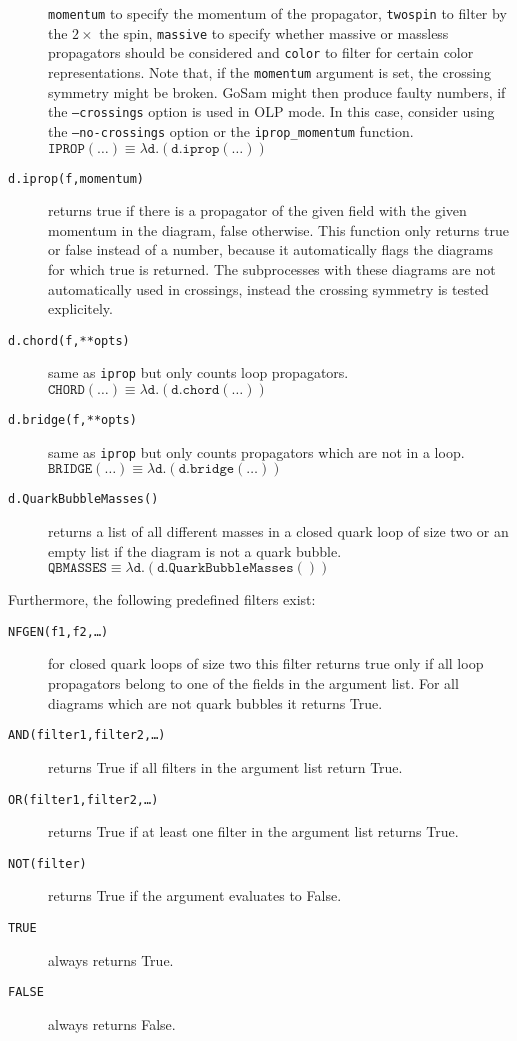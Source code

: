 \documentclass[11pt,a4paper]{refrep}
\newcommand{\gosam}{{\sc GoSam}\xspace}
\begin{document}
\begin{description}
   \texttt{momentum} to specify the momentum of the propagator,
   \texttt{twospin} to filter by the $2\times$ the spin,
   \texttt{massive} to specify whether massive or massless propagators
   should be considered and \texttt{color} to filter for certain color
   representations. Note that, if the {\tt momentum} argument is set, the 
   crossing symmetry might be broken. \gosam might then produce faulty numbers,
   if the {\tt --crossings} option is used in OLP mode. In this case, consider 
   using the {\tt --no-crossings} option or the {\tt iprop\_momentum} function.\\
   $\mathtt{IPROP(\ldots)}\equiv
    \lambda\mathtt{d}.(\mathtt{d.iprop(\ldots)})$
\item[\texttt{d.iprop(f,momentum)}] returns true if there is a propagator of the
   given field with the given momentum in the diagram, false otherwise. This 
   function only returns true or false instead of a number, because it automatically
   flags the diagrams for which true is returned. The subprocesses with these
   diagrams are not automatically used in crossings, instead the crossing symmetry
   is tested explicitely. 
\item[\texttt{d.chord(f,**opts)}] same as \texttt{iprop}
   but only counts loop propagators.\\
   $\mathtt{CHORD(\ldots)}\equiv
    \lambda\mathtt{d}.(\mathtt{d.chord(\ldots)})$
\item[\texttt{d.bridge(f,**opts)}] same as \texttt{iprop}
   but only counts propagators which are not in a loop.\\
   $\mathtt{BRIDGE(\ldots)}\equiv
    \lambda\mathtt{d}.(\mathtt{d.bridge(\ldots)})$
\item[\texttt{d.QuarkBubbleMasses()}] returns a list of
   all different masses in a closed quark loop of size two
   or an empty list if the diagram is not a quark bubble.\\
   $\mathtt{QBMASSES}\equiv
    \lambda\mathtt{d}.(\mathtt{d.QuarkBubbleMasses()})$
\end{description}

Furthermore, the following predefined filters exist:
\begin{description}
\item[\texttt{NFGEN(f1,f2,\ldots)}] for closed quark loops of size two
   this filter returns true only if all loop propagators belong to one
   of the fields in the argument list. For all diagrams which are not
   quark bubbles it returns True.
\item[\texttt{AND(filter1,filter2,\ldots)}] returns True if all filters
   in the argument list return True.
\item[\texttt{OR(filter1,filter2,\ldots)}] returns True if at least one filter
   in the argument list returns True.
\item[\texttt{NOT(filter)}] returns True if the argument evaluates to False.
\item[\texttt{TRUE}] always returns True.
\item[\texttt{FALSE}] always returns False.
\end{description}
\end{document}
